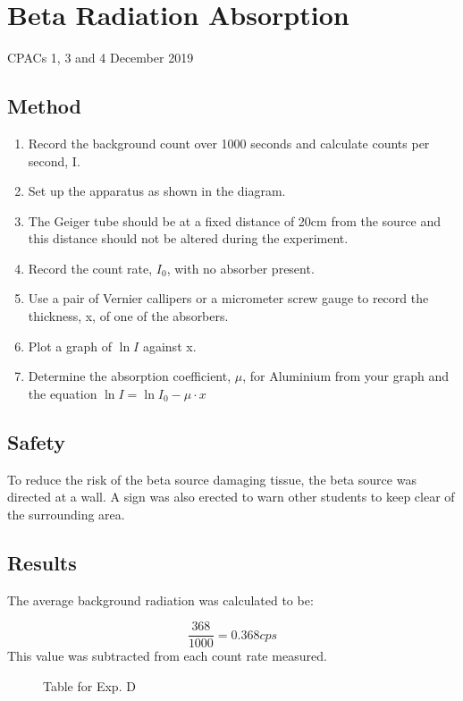 \section{Beta Radiation Absorption}
CPACs 1, 3 and 4
\hfill
{} December 2019

\subsection{Method}
\begin{enumerate}
  \item Record the background count over 1000 seconds and calculate counts per second, I.
  \item Set up the apparatus as shown in the diagram.
  \item The Geiger tube should be at a fixed distance of 20cm from the source and this distance should not be altered during the experiment.
  \item Record the count rate, $I_0$, with no absorber present.
  \item Use a pair of Vernier callipers or a micrometer screw gauge to record the thickness, x, of one of the absorbers.
  \item Plot a graph of $\ln{I}$ against x.
  \item Determine the absorption coefficient, $\mu$, for Aluminium from your graph and the equation $\ln{I}=\ln{I_0} - \mu \cdot x$
\end{enumerate}

\subsection{Safety}
To reduce the risk of the beta source damaging tissue, the beta source was directed at a wall. A sign was also erected to warn other students to keep clear of the surrounding area.

\subsection{Results}
The average background radiation was calculated to be:

\begin{equation*}
  \frac{368}{1000} = 0.368 cps
\end{equation*}
This value was subtracted from each count rate measured.

\begin{figure}[H]
  \centering
  \caption{Table for Exp. D}
\end{figure}

